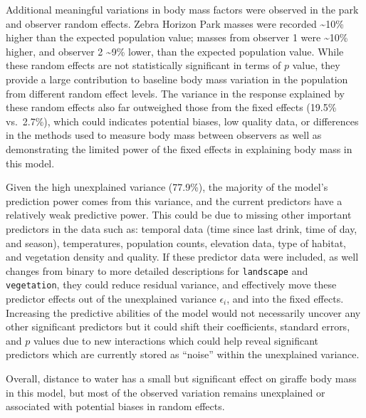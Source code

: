 \documentclass[
]{article}
\begin{document}
Additional meaningful variations in body mass factors were observed in
the park and observer random effects. Zebra Horizon Park masses were
recorded \textasciitilde10\% higher than the expected population value;
masses from observer 1 were \textasciitilde10\% higher, and observer 2
\textasciitilde9\% lower, than the expected population value. While
these random effects are not statistically significant in terms of \(p\)
value, they provide a large contribution to baseline body mass variation
in the population from different random effect levels. The variance in
the response explained by these random effects also far outweighed those
from the fixed effects (19.5\% vs.~2.7\%), which could indicates
potential biases, low quality data, or differences in the methods used
to measure body mass between observers as well as demonstrating the
limited power of the fixed effects in explaining body mass in this
model.

Given the high unexplained variance (77.9\%), the majority of the
model's prediction power comes from this variance, and the current
predictors have a relatively weak predictive power. This could be due to
missing other important predictors in the data such as: temporal data
(time since last drink, time of day, and season), temperatures,
population counts, elevation data, type of habitat, and vegetation
density and quality. If these predictor data were included, as well
changes from binary to more detailed descriptions for \texttt{landscape}
and \texttt{vegetation}, they could reduce residual variance, and
effectively move these predictor effects out of the unexplained variance
\(\epsilon_i\), and into the fixed effects. Increasing the predictive
abilities of the model would not necessarily uncover any other
significant predictors but it could shift their coefficients, standard
errors, and \(p\) values due to new interactions which could help reveal
significant predictors which are currently stored as ``noise'' within
the unexplained variance.

Overall, distance to water has a small but significant effect on giraffe
body mass in this model, but most of the observed variation remains
unexplained or associated with potential biases in random effects.
\end{document}
